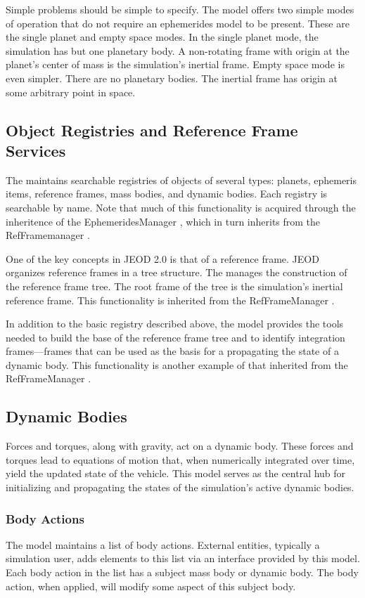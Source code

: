 Simple problems should be simple to specify. The model offers two simple
modes of operation that do not require an ephemerides model to be present.
These are the single planet and empty space modes. In the single planet mode,
the simulation has but one planetary body. A non-rotating frame with origin
at the planet's center of mass is the simulation's inertial frame.
Empty space mode is even simpler. There are no planetary bodies. The
inertial frame has origin at some arbitrary point in space.

\subsection{Object Registries and Reference Frame Services}
The \ModelDesc maintains searchable registries of objects of several types:
planets, ephemeris items, reference frames, mass bodies, and dynamic bodies.
Each registry is searchable by name. Note that much of this functionality
is acquired through the inheritence of the 
EphemeridesManager \cite{dynenv:EPHEMERIDES}, which in turn inherits
from the RefFramemanager \cite{dynenv:REFFRAMES}.

One of the key concepts in JEOD 2.0 is that of a reference frame.
JEOD organizes reference frames in a tree structure.
The \ModelDesc manages the construction of the reference frame
tree. 
The root frame of the tree is the simulation's inertial
reference frame. This functionality is inherited from the
RefFrameManager \cite{dynenv:REFFRAMES}.

In addition to the basic registry described above,
the model provides the tools needed to build the base of the reference
frame tree and to identify integration frames---frames that can be used as
the basis for a propagating the state of a dynamic body. This functionality
is another example of that inherited from the 
RefFrameManager \cite{dynenv:REFFRAMES}.

\subsection{Dynamic Bodies}
Forces and torques, along with gravity, act on a dynamic body.
These forces and torques lead to equations of motion that,
when numerically integrated over time,
yield the updated state of the vehicle.
This model serves as the central hub for initializing and propagating
the states of the simulation's active dynamic bodies.

\subsubsection{Body Actions}
The model maintains a list of body actions. External entities,
typically a simulation user, adds elements to this list via an
interface provided by this model. Each body action in the list has
a subject mass body or dynamic body. The body action, when applied,
will modify some aspect of this subject body.

